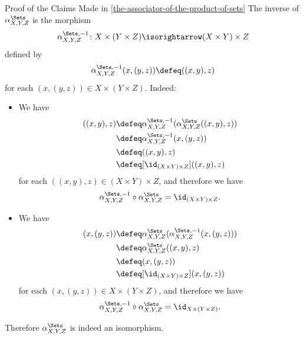 \begin{Proof}{Proof of the Claims Made in \cref{the-associator-of-the-product-of-sets}}%
    The inverse of $\alpha^{\Sets}_{X,Y,Z}$ is the morphism
    \[
        \alpha^{\Sets,-1}_{X,Y,Z}
        \colon
        X\times(Y\times Z)
        \isorightarrow
        (X\times Y)\times Z
    \]%
    defined by
    \[
        \alpha^{\Sets,-1}_{X,Y,Z}(x,(y,z))%
        \defeq%
        ((x,y),z)%
    \]%
    for each $(x,(y,z))\in X\times(Y\times Z)$. Indeed:
    \begin{itemize}
        \item{}We have
            \begin{align*}
                [\alpha^{\Sets,-1}_{X,Y,Z}\circ\alpha^{\Sets}_{X,Y,Z}]((x,y),z) &\defeq \alpha^{\Sets,-1}_{X,Y,Z}(\alpha^{\Sets}_{X,Y,Z}((x,y),z))\\
                                                                                &\defeq \alpha^{\Sets,-1}_{X,Y,Z}(x,(y,z))\\
                                                                                &\defeq ((x,y),z)\\
                                                                                &\defeq [\id_{(X\times Y)\times Z}]((x,y),z)
            \end{align*}
            for each $((x,y),z)\in(X\times Y)\times Z$, and therefore we have
            \[
                \alpha^{\Sets,-1}_{X,Y,Z}\circ\alpha^{\Sets}_{X,Y,Z}%
                =%
                \id_{(X\times Y)\times Z}.%
            \]%
        \item{}We have
            \begin{align*}
                [\alpha^{\Sets}_{X,Y,Z}\circ\alpha^{\Sets,-1}_{X,Y,Z}](x,(y,z)) &\defeq \alpha^{\Sets}_{X,Y,Z}(\alpha^{\Sets,-1}_{X,Y,Z}(x,(y,z)))\\
                                                                                &\defeq \alpha^{\Sets}_{X,Y,Z}((x,y),z)\\
                                                                                &\defeq (x,(y,z))\\
                                                                                &\defeq [\id_{(X\times Y)\times Z}](x,(y,z))
            \end{align*}
            for each $(x,(y,z))\in X\times(Y\times Z)$, and therefore we have
            \[
                \alpha^{\Sets,-1}_{X,Y,Z}\circ\alpha^{\Sets}_{X,Y,Z}%
                =%
                \id_{X\times(Y\times Z)}.%
            \]%
    \end{itemize}
    Therefore $\alpha^{\Sets}_{X,Y,Z}$ is indeed an isomorphism.


\end{Proof}
